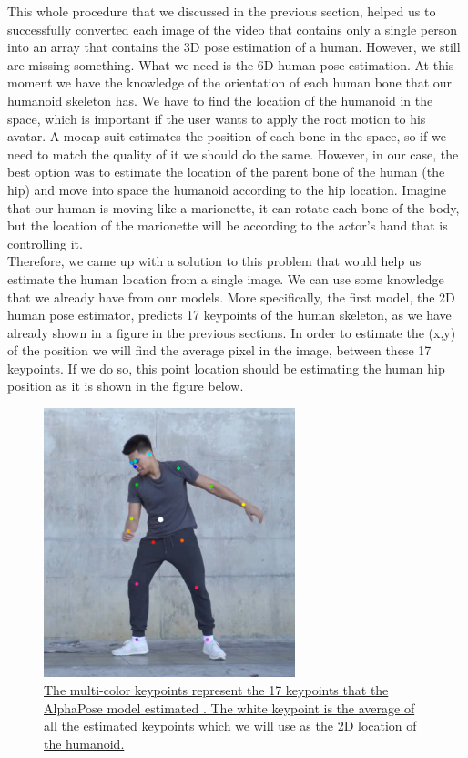 This whole procedure that we discussed in the previous section, helped us to successfully converted each image of the video that contains only a single person into an array that contains the 3D pose estimation of a human. However, we still are missing something. What we need is the 6D human pose estimation. At this moment we have the knowledge of the orientation of each human bone that our humanoid skeleton has. We have to find the location of the humanoid in the space, which is important if the user wants to apply the root motion to his avatar. A mocap suit estimates the position of each bone in the space, so if we need to match the quality of it we should do the same. However, in our case, the best option was to estimate the location of the parent bone of the human (the hip) and move into space the humanoid according to the hip location. Imagine that our human is moving like a marionette, it can rotate each bone of the body, but the location of the marionette will be according to the actor's hand that is controlling it.\\

Therefore, we came up with a solution to this problem that would help us estimate the human location from a single image. We can use some knowledge that we already have from our models. More specifically, the first model, the 2D human pose estimator, predicts 17 keypoints of the human skeleton, as we have already shown in a figure in the previous sections. In order to estimate the (x,y) of the position we will find the average pixel in the image, between these 17 keypoints. If we do so, this point location should be estimating the human hip position as it is shown in the figure below.

\pagebreak

\begin{figure}[h]
	\centering
	\includegraphics[width=0.65\textwidth]{figures/Implementation/position2D.png}
	\captionsetup{labelformat=empty}
	\caption{\href{https://www.pexels.com/search/videos/dance/}
	{The multi-color keypoints represent the 17 keypoints that the AlphaPose model estimated . The white keypoint is the average of all the estimated keypoints which we will use as the 2D location of the humanoid.}}
\end{figure}

